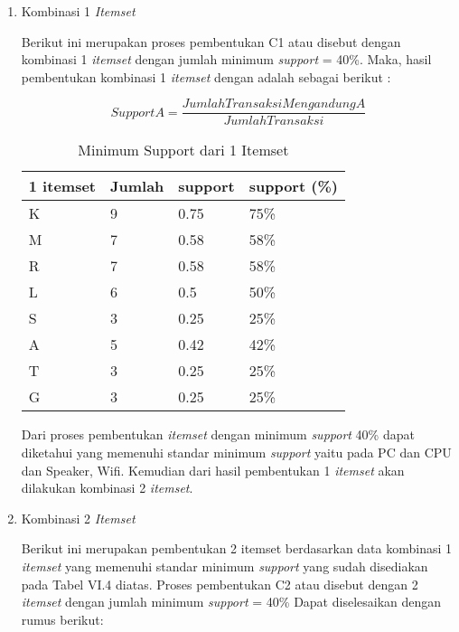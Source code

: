 \begin{enumerate}
\item Kombinasi 1 \textit{Itemset}
\par Berikut ini merupakan proses pembentukan C1 atau disebut dengan kombinasi 1 \textit{itemset} dengan jumlah minimum \textit{support} = 40\%. Maka, hasil pembentukan kombinasi 1 \textit{itemset} dengan  adalah sebagai berikut :

\begin{equation}
    Support A =\frac{Jumlah Transaksi Mengandung A}{Jumlah Transaksi} 
    \end{equation}

\begin{table}[!h]
\caption{Minimum Support dari 1 Itemset}
\begin{center}
\begin{tabular}{|l|l|l|l|}
\hline
1 itemset & Jumlah & support & support (\%) \\ \hline
K         & 9      & 0.75    & 75\%         \\ \hline
M         & 7      & 0.58    & 58\%         \\ \hline
R         & 7      & 0.58    & 58\%         \\ \hline
L         & 6      & 0.5     & 50\%         \\ \hline
S         & 3      & 0.25    & 25\%         \\ \hline
A         & 5      & 0.42    & 42\%         \\ \hline
T         & 3      & 0.25    & 25\%         \\ \hline
G         & 3      & 0.25    & 25\%         \\ \hline
\end{tabular}
\end{center}
\end{table}

\par Dari proses pembentukan \textit{itemset} dengan minimum \textit{support} 40\% dapat diketahui yang memenuhi standar minimum \textit{support} yaitu pada PC dan CPU dan Speaker, Wifi. Kemudian dari hasil pembentukan 1 \textit{itemset} akan dilakukan kombinasi 2 \textit{itemset}.

\pagebreak
\item Kombinasi  2 \textit{Itemset}
\par Berikut ini merupakan pembentukan 2 itemset berdasarkan data kombinasi 1 \textit{itemset}  yang memenuhi standar minimum \textit{support} yang sudah disediakan pada Tabel VI.4 diatas. Proses pembentukan C2 atau disebut dengan 2 \textit{itemset} dengan jumlah minimum \textit{support} = 40\% Dapat diselesaikan dengan rumus berikut:


\end{enumerate}
